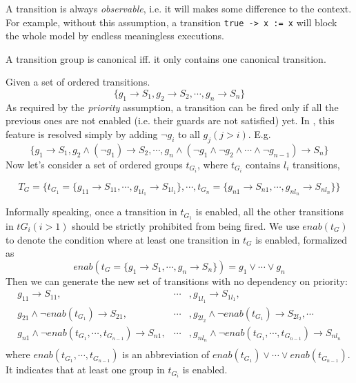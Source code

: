  A transition is always \emph{observable}, i.e. it will makes some difference to the context. For example, without this assumption, a transition \texttt{true -> x := x} will block the whole model by endless meaningless executions.

\begin{definition}
    A transition group is canonical iff. it only contains one canonical transition.
\end{definition}

 Given a set of ordered transitions.
\[
    \{g_1\rightarrow S_1,g_2\rightarrow S_2,\cdots,g_n\rightarrow S_n\}
\]
As required by the \emph{priority} assumption, a transition can be fired only if all the previous ones are not enabled (i.e. their guards are not satisfied) yet. In \lang{}, this feature is resolved simply by adding $\lnot g_i$ to all $g_j(j>i)$. E.g.
\[
    \{g_1\rightarrow S_1, g_2\land(\lnot g_1)\rightarrow S_2,\cdots,g_n\land(\lnot g_1\land \lnot g_2\land\cdots\land \lnot g_{n-1})\rightarrow S_n\}
\]
Now let's consider a set of ordered groups $t_{G_i}$, where $t_{G_i}$ contains $l_i$ transitions,
\begin{small}
\[
    T_G=\{t_{G_1}=\{g_{11}\rightarrow S_{11},\cdots, g_{1l_1}\rightarrow S_{1l_1}\},\cdots,t_{G_n}=\{g_{n1}\rightarrow S_{n1},\cdots,g_{nl_n}\rightarrow S_{nl_n}\}\}
\]
\end{small}
Informally speaking, once a transition in $t_{G_1}$ is enabled, all the other transitions in $t{G_i}(i>1)$ should be strictly prohibited from being fired. We use $enab(t_G)$ to denote the condition where at least one transition in $t_G$ is enabled, formalized as
\[
    enab(t_G=\{g_1\rightarrow S_1,\cdots, g_n\rightarrow S_n\}) = g_1\lor\cdots\lor g_n
\]
Then we can generate the new set of transitions with no dependency on priority:
\begin{eqnarray*}
    g_{11}\rightarrow S_{11},&\cdots&,g_{1l_1}\rightarrow S_{1l_1}, \\
    g_{21}\land \lnot enab(t_{G_1})\rightarrow S_{21}, &\cdots&, g_{2l_2} \land \lnot enab(t_{G_1})\rightarrow S_{2l_2}, \cdots \\
    g_{n1}\land \lnot enab(t_{G_1},\cdots,t_{G_{n-1}})\rightarrow S_{n1}, &\cdots&, g_{nl_n} \land \lnot enab(t_{G_1},\cdots,t_{G_{n-1}})\rightarrow S_{nl_n} \\
\end{eqnarray*}
where $enab(t_{G_1},\cdots,t_{G_{n-1}})$ is an abbreviation of $enab(t_{G_1})\lor\cdots\lor enab(t_{G_{n-1}})$. It indicates that at least one group in $t_{G_i}$ is enabled.
